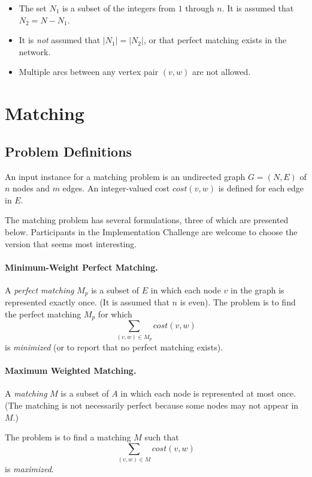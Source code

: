 \begin{itemize}
\item  The set $N_1$ is a subset of the integers 
from $1$ through $n$.  It is assumed that $N_2 = N - N_1$.

\item It is {\em not} assumed that $|N_1| = |N_2|$, or that 
perfect matching exists in the network.

\item Multiple arcs between any vertex pair $(v,w)$ are not allowed. 

\end{itemize} 

\section{Matching}

\subsection{Problem Definitions} 
An input instance for a matching problem is an undirected graph $G =
(N,E)$ of $n$ nodes and $m$ edges.  An integer-valued cost
$cost(v,w)$ is defined for each edge in $E$.

The matching problem has several formulations, three of which are
presented below.  Participants in the Implementation Challenge are
welcome to choose the version that seems most interesting.

\paragraph{Minimum-Weight Perfect Matching.}
A {\em perfect matching} $M_p$ is a subset of $E$ in which each node 
$v$  in the graph is represented exactly once.  (It is assumed that $n$ is
even).  The problem is to find the perfect matching $M_p$ for which
\[
\sum_{(v,w) \in M_p}  cost(v,w)
\] 
is {\em minimized} (or to report that no perfect matching exists).

\paragraph{Maximum Weighted Matching.}
A {\em matching} $M$ is a subset of $A$ in which each node is
represented at most once. (The matching is not necessarily perfect
because some nodes may not appear in $M$.)

The problem is to find a matching $M$ such that
\[
\sum_{(v,w) \in M} cost(v,w)
\]
is {\em maximized}.

